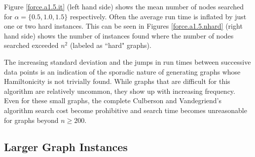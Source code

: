 \documentclass[twoside,11pt]{article}
\begin{document}

Figure  \ref{force.a1.5.it} (left hand side) shows the mean number of %
nodes searched for $\alpha = \{0.5, 1.0, 1.5\}$ respectively.
Often the average run time is inflated by just one or two hard instances.  This can be seen in
Figures \ref{force.a1.5.nhard} (right hand side) shows  the number of
instances found where the number of nodes searched exceeded $ n^2 $ (labeled as ``hard" graphs).


The increasing standard deviation and the jumps in run times between successive data points is
an indication of the sporadic nature of generating graphs whose Hamiltonicity is not trivially found.
While graphs that are
difficult for this algorithm are relatively uncommon, they show up with increasing frequency.  Even for these small graphs,
the 
complete Culberson and Vandegriend's algorithm
search cost become prohibitive and search time becomes unreasonable for graphs beyond $n \ge 200$.

\subsection{Larger Graph Instances}
\end{document}
